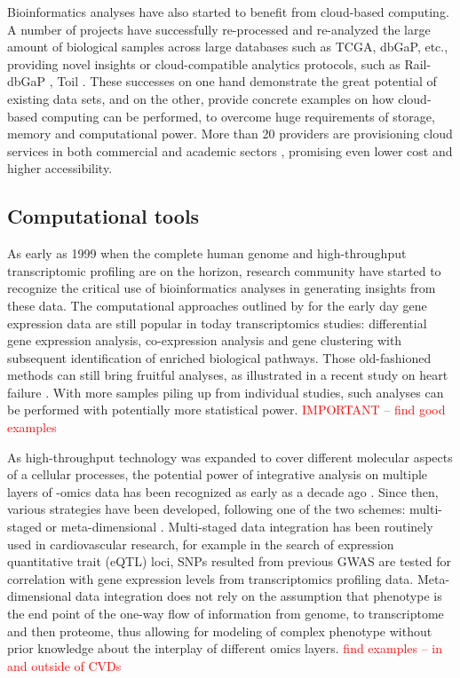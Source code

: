\documentclass[letter]{bioinfo}
\newcommand{\comment}[1]{\textcolor{red}{#1}}
\begin{document}
Bioinformatics analyses have also started to benefit from cloud-based computing.
A number of projects have successfully re-processed and re-analyzed the large amount of biological samples across large databases such as TCGA, dbGaP, etc., providing novel insights or cloud-compatible analytics protocols, such as Rail-dbGaP \citep{Nellore:2016:RaildbGaP}, Toil \citep{Vivian:2017:Toil}. These successes on one hand demonstrate the great potential of existing data sets, and on the other, provide concrete examples on how cloud-based computing can be performed, to overcome huge requirements of storage, memory and computational power. More than 20 providers are provisioning cloud services in both commercial and academic sectors \citep{Langmead:2018:Cloud}, promising even lower cost and higher accessibility.


%

\subsection{Computational tools}

As early as 1999 when the complete human genome and high-throughput transcriptomic profiling are on the horizon, research community have started to recognize the critical use of bioinformatics analyses in generating insights from these data. The computational approaches outlined by \cite{Claverie:1999:Computational} for the early day gene expression data are still popular in today transcriptomics studies: differential gene expression analysis, co-expression analysis and gene clustering with subsequent identification of enriched biological pathways. Those old-fashioned methods can still bring fruitful analyses, as illustrated in a recent study on heart failure \citep{Santolini:2018:personalized}. With more samples piling up from individual studies, such analyses can be performed with potentially more statistical power. \comment{IMPORTANT -- find good examples}

As high-throughput technology was expanded to cover different molecular aspects of a cellular processes, the potential power of integrative analysis on multiple layers of -omics data has been recognized as early as a decade ago \citep{Hawkins:2010:Nextgeneration}. Since then, various strategies have been developed, following one of the two schemes: multi-staged or meta-dimensional \cite{Ritchie:2015:Methods}. Multi-staged data integration has been routinely used in cardiovascular research, for example in the search of expression quantitative trait (eQTL) loci, SNPs resulted from previous GWAS are tested for correlation with gene expression levels from transcriptomics profiling data. Meta-dimensional data integration does not rely on the assumption that phenotype is the end point of the one-way flow of information from genome, to transcriptome and then proteome, thus allowing for modeling of complex phenotype without prior knowledge about the interplay of different omics layers.
\comment{find examples -- in and outside of CVDs}
\end{document}
